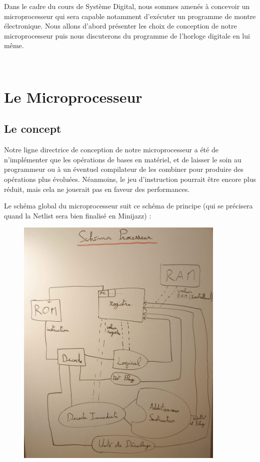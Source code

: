 \documentclass[a4paper, 12pt, twoside]{report}
\begin{document}
Dans le cadre du cours de Système Digital, nous sommes amenés à concevoir un microprocesseur
qui sera capable notamment d'exécuter un programme de montre électronique.
Nous allons d'abord présenter les choix de conception de notre microprocesseur
puis nous discuterons du programme de l'horloge digitale en lui même.

\newpage~
\newpage~

\section{Le Microprocesseur}

\subsection{Le concept}

Notre ligne directrice de conception de notre microprocesseur a été de n'implémenter que 
les opérations de bases en matériel, et de laisser le soin au programmeur ou à un 
éventuel compilateur de les combiner pour produire des opérations plus évoluées.
Néanmoins, le jeu d'instruction pourrait être encore plus réduit, mais cela ne jouerait 
pas en faveur des performances.

Le schéma global du microprocesseur suit ce schéma de principe (qui se précisera 
quand la Netlist sera bien finalisé en Minijazz) :\\

\begin{figure}[!h]
\centering
\includegraphics[width=10cm]{schema_micro.jpg}
\end{figure}
\end{document}
